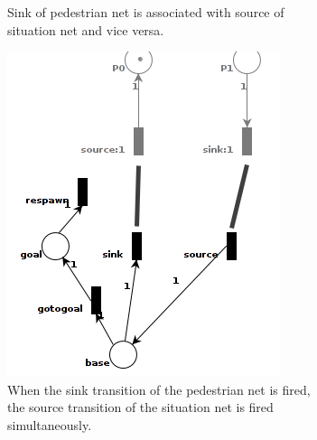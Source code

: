 \documentclass[11pt, a4paper]{book}
\begin{document}
\begin{figure}
\begin{subfigure}[b]{0.4\textwidth}
\caption{Sink of pedestrian net is associated with source of situation net and vice versa.}
\end{subfigure}
\hspace{.1\textwidth}
\begin{subfigure}[b]{0.4\textwidth}
\includegraphics[width =\textwidth]{petrinet_pictures/fired.png}
\caption{When the sink transition of the pedestrian net is fired, the source transition of the situation net is fired simultaneously.}
\end{subfigure}
\begin{subfigure}[b]{0.4\textwidth}

\end{subfigure}
\end{figure}
\end{document}
